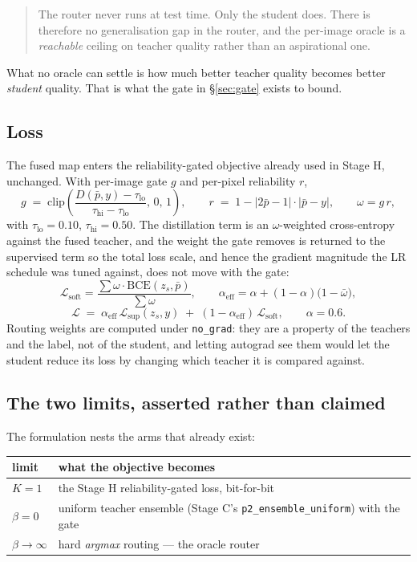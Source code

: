 \documentclass[11pt,a4paper]{article}
\begin{document}
\begin{quote}
The router never runs at test time. Only the student does. There is therefore no
generalisation gap in the router, and the per-image oracle is a \emph{reachable}
ceiling on teacher quality rather than an aspirational one.
\end{quote}

What no oracle can settle is how much better teacher quality becomes better
\emph{student} quality. That is what the gate in \S\ref{sec:gate} exists to bound.

\subsection{Loss}

The fused map enters the reliability-gated objective already used in Stage H,
unchanged. With per-image gate $g$ and per-pixel reliability $r$,
\[
g \;=\; \mathrm{clip}\!\left(\frac{D(\bar p, y) - \tau_{\text{lo}}}
{\tau_{\text{hi}} - \tau_{\text{lo}}},\,0,\,1\right),
\qquad
r \;=\; 1 - \lvert 2\bar p - 1\rvert \cdot \lvert \bar p - y\rvert,
\qquad
\omega = g\,r,
\]
with $\tau_{\text{lo}} = 0.10$, $\tau_{\text{hi}} = 0.50$. The distillation term
is an $\omega$-weighted cross-entropy against the fused teacher, and the weight
the gate removes is returned to the supervised term so the total loss scale, and
hence the gradient magnitude the LR schedule was tuned against, does not move
with the gate:
\[
\mathcal{L}_{\text{soft}} = \frac{\sum \omega \cdot \mathrm{BCE}(z_s, \bar p)}{\sum \omega},
\qquad
\alpha_{\text{eff}} = \alpha + (1-\alpha)\bigl(1 - \bar\omega\bigr),
\]
\[
\mathcal{L} \;=\; \alpha_{\text{eff}}\,\mathcal{L}_{\text{sup}}(z_s, y)
\;+\; (1-\alpha_{\text{eff}})\,\mathcal{L}_{\text{soft}},
\qquad \alpha = 0.6 .
\]
Routing weights are computed under \texttt{no\_grad}: they are a property of the
teachers and the label, not of the student, and letting autograd see them would
let the student reduce its loss by changing which teacher it is compared against.

\subsection{The two limits, asserted rather than claimed}

The formulation nests the arms that already exist:

\begin{center}
\small
\begin{tabular}{ll}
\toprule
limit & what the objective becomes \\
\midrule
$K=1$ & the Stage H reliability-gated loss, bit-for-bit \\
$\beta = 0$ & uniform teacher ensemble (Stage C's \texttt{p2\_ensemble\_uniform}) with the gate \\
$\beta \to \infty$ & hard \emph{argmax} routing --- the oracle router \\
\bottomrule
\end{tabular}
\end{center}
\end{document}

